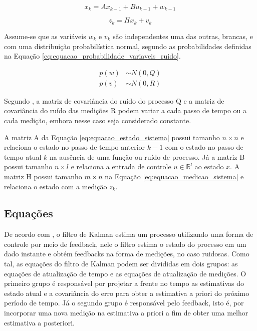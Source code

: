 \documentclass[acronym, symbols, table, deposito]{fei}
\begin{document}
			\begin{equation} \label{eq:equacao_estado_sistema}
				x_k = Ax_{k-1} + Bu_{k-1} + w_{k-1}
			\end{equation}
		
			\begin{equation} \label{eq:equacao_medicao_sistema}
				z_k = Hx_k + v_k
			\end{equation}
		
			Assume-se que as variáveis $w_k$ e $v_k$ são independentes uma das outras, brancas, e com uma distribuição probabilística normal, segundo as probabilidades definidas na Equação \eqref{eq:equacao_probabilidade_variaveis_ruido}.
			
			\begin{equation} \label{eq:equacao_probabilidade_variaveis_ruido}
				\begin{split}
					p(w) &\sim N(0, Q) \\
					p(v) &\sim N(0, R)
				\end{split}
			\end{equation}
		
			Segundo \textcite{welch1995introduction}, a matriz de covariância do ruído do processo Q e a matriz de covariância do ruído das medições R podem variar a cada passo de tempo ou a cada medição, embora nesse caso seja considerado constante.
			
			A matriz A da Equação \eqref{eq:equacao_estado_sistema} possui tamanho $n \times n$ e relaciona o estado no passo de tempo anterior $k - 1$ com o estado no passo de tempo atual $k$ na ausência de uma função ou ruído de processo. Já a matriz B possui tamanho $n \times l$ e relaciona a entrada de controle $u \in \mathbb{R}^l$ ao estado $x$. A matriz H possui tamanho $m \times n$ na Equação \eqref{eq:equacao_medicao_sistema} e relaciona o estado com a medição $z_k$.
			
		\subsection{Equações} \label{sec:filtro_de_kalman_equacoes}
			
			De acordo com \textcite{khodarahmi2023review}, o filtro de Kalman estima um processo utilizando uma forma de controle por meio de feedback, nele o filtro estima o estado do processo em um dado instante e obtém feedbacks na forma de medições, no caso ruidosas. Como tal, as equações do filtro de Kalman podem ser divididas em dois grupos: as equações de atualização de tempo e as equações de atualização de medições. O primeiro grupo é responsável por projetar a frente no tempo as estimativas do estado atual e a covariância do erro para obter a estimativa a priori do próximo período de tempo. Já o segundo grupo é responsável pelo feedback, isto é, por incorporar uma nova medição na estimativa a priori a fim de obter uma melhor estimativa a posteriori.
			
\end{document}
